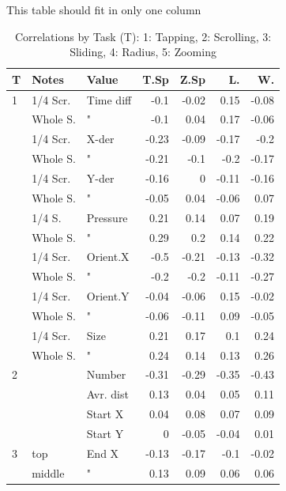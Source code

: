 \documentclass{sigchi}
\begin{document}
This table should fit in only one column
\begin{table}
\caption{Correlations by Task (T): 1: Tapping, 2: Scrolling, 3: Sliding, 4: Radius, 5: Zooming }
\label{allCorrelations}
    \begin{tabular}{|lll|rrrr|}
    \hline
    T & Notes       & Value     & T.Sp  & Z.Sp   & L. & W. \\ \hline
    1    & 1/4 Scr.  & Time diff & -0.1  & -0.02  & 0.15   & -0.08 \\
    ~    & Whole S.   & "         & -0.1  & 0.04   & 0.17   & -0.06 \\
    ~    & 1/4 Scr.  & X-der     & -0.23 & -0.09  & -0.17  & -0.2  \\
    ~    & Whole S.   & "         & -0.21 & -0.1   & -0.2   & -0.17 \\
    ~    & 1/4 Scr.  &  Y-der    & -0.16 & 0      & -0.11  & -0.16 \\
    ~    & Whole S.   & "         & -0.05 & 0.04   & -0.06  & 0.07  \\
    ~    & 1/4 S.  & Pressure  & 0.21  & 0.14   & 0.07   & 0.19  \\
    ~    & Whole S.   & "         & 0.29  & 0.2    & 0.14   & 0.22  \\
    ~    & 1/4 Scr.  & Orient.X  & -0.5  & -0.21  & -0.13  & -0.32 \\
    ~    & Whole S.   & "         & -0.2  & -0.2   & -0.11  & -0.27 \\
    ~    & 1/4 Scr.  & Orient.Y  & -0.04 & -0.06  & 0.15   & -0.02 \\
    ~    & Whole S.   & "         & -0.06 & -0.11  & 0.09   & -0.05 \\
    ~    & 1/4 Scr.  & Size      & 0.21  & 0.17   & 0.1    & 0.24  \\
    ~    & Whole S.   & "         & 0.24  & 0.14   & 0.13   & 0.26  \\ \hline
    2    & ~           & Number    & -0.31 & -0.29  & -0.35  & \cellcolor[gray]{0.9}-0.43 \\
    ~    & ~           & Avr. dist & 0.13  & 0.04   & 0.05   & 0.11  \\
    ~    & ~           & Start X   & 0.04  & 0.08   & 0.07   & 0.09  \\
    ~    & ~           & Start Y   & 0     & -0.05  & -0.04  & 0.01  \\ \hline
    3    & top  & End X     & -0.13 & -0.17  & -0.1   & -0.02 \\
    ~    & middle  & "         & 0.13  & 0.09   & 0.06   & 0.06  \\

\end{tabular}
\end{table}
\end{document}
